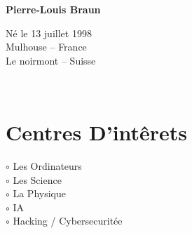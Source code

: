 \documentclass[a4paper,10pt]{article}
\begin{document}
\thispagestyle{empty}

\begin{adjustbox}{valign=t}
\begin{minipage}{0.3\textwidth} %
\begin{center}

\MySkip 	%

\raggedright
{\LARGE \bfseries Pierre-Louis Braun}

\MySkip 	%

Né le 13 juillet 1998\\
Mulhouse -- France\\
Le noirmont -- Suisse\\


\MySkip 	%

\textcolor{ColorTwo}{\faEnvelopeO}
 \\

\end{center}

\vfill

\section*{Centres D'intêrets}
\raggedright
\begin{spacing}{1.0}
\textcolor{ColorOne}{$\circ$} Les Ordinateurs\\
\textcolor{ColorOne}{$\circ$} Les Science\\
\textcolor{ColorOne}{$\circ$} La Physique\\
\textcolor{ColorOne}{$\circ$} IA\\
\textcolor{ColorOne}{$\circ$} Hacking / Cybersecuritée\\
\end{spacing}


\end{minipage}
\end{adjustbox}
\end{document}
